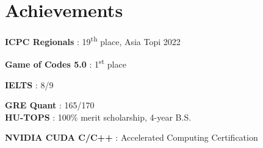 \documentclass[letterpaper,10pt]{article}
\newcommand{\subheadingtitlevspace}{
\vspace{-3pt}
}
\newcommand{\titleItem}[1]{
  \textbf{#1}
}
\begin{document}
\section{Achievements}
\subheadingtitlevspace
\begin{itemize}[leftmargin=0.15in, label={}]
	{\item{
          \titleItem{ICPC Regionals}{: 19\textsuperscript{th} place, Asia Topi 2022} \hspace{1cm}
          \titleItem{Game of Codes 5.0}{: 1\textsuperscript{st} place} \hspace{1cm}
          \titleItem{IELTS}{: 8/9} \hspace{1cm}
          \titleItem{GRE Quant}{: 165/170} \\
          \titleItem{HU-TOPS}{: 100\% merit scholarship, 4-year B.S.} \hspace{1cm}
          \titleItem{NVIDIA CUDA C/C++}{: Accelerated Computing Certification}
	}}
\end{itemize}

\end{document}
